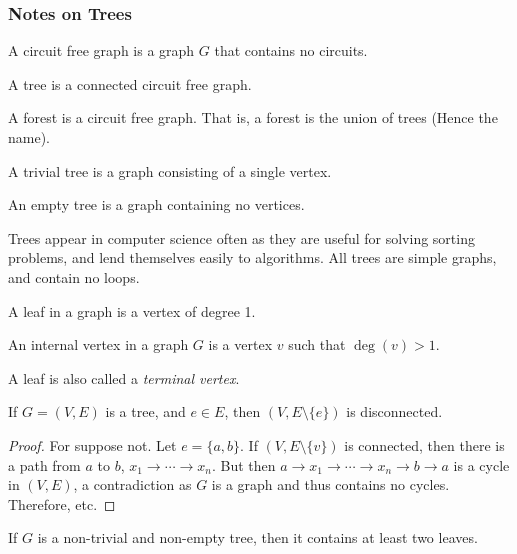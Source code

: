     \subsubsection{Notes on Trees}
        \begin{definition}
            A circuit free graph is a graph $G$ that contains
            no circuits.
        \end{definition}
        \begin{definition}
            A tree is a connected circuit free graph.
        \end{definition}
        A forest is a circuit free graph. That is, a forest is the union
        of trees (Hence the name).
        \begin{definition}
            A trivial tree is a graph consisting of a single vertex.
        \end{definition}
        \begin{definition}
            An empty tree is a graph containing no vertices.
        \end{definition}
        Trees appear in computer science often as they are useful for
        solving sorting problems, and lend themselves easily to
        algorithms. All trees are simple graphs, and contain no loops.
        \begin{definition}
            A leaf in a graph is a vertex of degree 1.
        \end{definition}
        \begin{definition}
            An internal vertex in a graph $G$ is a vertex $v$ such
            that $\deg(v)>1$.
        \end{definition}
        A leaf is also called a \textit{terminal vertex}.
        \begin{theorem}
            If $G=(V,E)$ is a tree, and
            $e\in{E}$, then $(V,E\setminus\{e\})$ is
            disconnected.
        \end{theorem}
        \begin{proof}
            For suppose not. Let $e=\{a,b\}$. If $(V,E\setminus\{v\})$
            is connected, then there is a path from $a$ to $b$,
            $x_{1}\rightarrow\cdots\rightarrow{x_{n}}$. But then
            $a\rightarrow{x_{1}}\rightarrow\cdots%
             \rightarrow{x_{n}}\rightarrow{b}\rightarrow{a}$ is a
            cycle in $(V,E)$, a contradiction as $G$ is a graph
            and thus contains no cycles. Therefore, etc.
        \end{proof}
        \begin{theorem}
            If $G$ is a non-trivial and non-empty tree, then
            it contains at least two leaves.
        \end{theorem}
